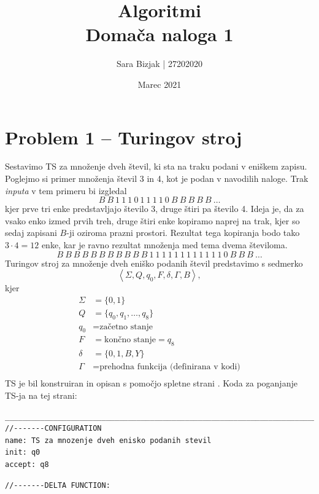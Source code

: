 \documentclass[a4paper,11pt]{article}
\title{Algoritmi \\
\textbf{Domača naloga 1} }
\author{Sara Bizjak  |  27202020}
\date{Marec 2021}
\begin{document}
\maketitle


\section*{Problem 1 -- Turingov stroj}

Sestavimo TS za množenje dveh števil, ki sta na traku podani v eniškem zapisu. 
\\
Poglejmo si primer množenja števil 3 in 4, kot je podan v navodilih naloge. 
Trak \textit{inputa} v tem primeru bi izgledal 
$$
B \ B \ 1 \ 1 \ 1 \ 0 \ 1 \ 1 \ 1 \ 1 \ 0 \ B \ B \ B \ B \ B \ \ldots
$$
kjer prve tri enke predstavljajo število 3, druge štiri pa število 4.
Ideja je, da za vsako enko izmed prvih treh, druge štiri enke kopiramo naprej na trak, kjer so sedaj zapisani $B$-ji oziroma prazni prostori.
Rezultat tega kopiranja bodo tako $3 \cdot 4 = 12$ enke, kar je ravno rezultat množenja med tema dvema številoma.
$$
B \ B \ B \ B \ B \ B \ B \ B \ B \ B \ B \ 1 \ 1 \ 1 \ 1 \ 1 \ 1 \ 1 \ 1 \ 1 \ 1 \ 1 \ 1 \ 0 \ B \ B \ B \ \ldots
$$
\noindent
Turingov stroj za množenje dveh eniško podanih števil predstavimo s sedmerko
$$
\left< \Sigma, Q, q_0, F, \delta, \Gamma, B \right>,
$$
kjer
\begin{align*}
\Sigma &= \{0, 1 \}
\\
Q &= \{ q_0, q_1, \ldots, q_8 \}
\\
q_0 &= \text{začetno stanje}
\\
F &= \text{končno stanje} = q_8
\\
\delta &= \{ 0, 1, B, Y \}
\\
\Gamma &= \text{prehodna funkcija (definirana v kodi)}
\\
\end{align*}
TS je bil konstruiran in opisan s pomočjo spletne strani \cite{bib:TS}.
Koda za poganjanje TS-ja na tej strani:
\\
\begin{lstlisting}
________________________________________________________________________
//-------CONFIGURATION
name: TS za mnozenje dveh enisko podanih stevil
init: q0
accept: q8
\end{lstlisting}
\begin{lstlisting}
//-------DELTA FUNCTION: 
\end{lstlisting}
\end{document}
